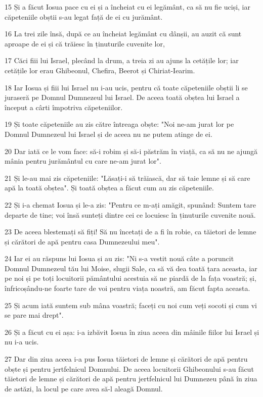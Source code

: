 \par 15 Și a făcut Iosua pace cu ei și a încheiat cu ei legământ, ca să nu fie uciși, iar căpeteniile obștii s-au legat față de ei cu jurământ.
\par 16 La trei zile însă, după ce au încheiat legământ cu dânșii, au auzit că sunt aproape de ei și că trăiesc în ținuturile cuvenite lor,
\par 17 Căci fiii lui Israel, plecând la drum, a treia zi au ajuns la cetățile lor; iar cetățile lor erau Ghibeonul, Chefira, Beerot și Chiriat-Iearim.
\par 18 Iar Iosua și fiii lui Israel nu i-au ucis, pentru că toate căpeteniile obștii li se juraseră pe Domnul Dumnezeul lui Israel. De aceea toată obștea lui Israel a început a cârti împotriva căpeteniilor.
\par 19 Și toate căpeteniile au zis către întreaga obște: "Noi ne-am jurat lor pe Domnul Dumnezeul lui Israel și de aceea nu ne putem atinge de ei.
\par 20 Dar iată ce le vom face: să-i robim și să-i păstrăm în viață, ca să nu ne ajungă mânia pentru jurământul cu care ne-am jurat lor".
\par 21 Și le-au mai zis căpeteniile: "Lăsați-i să trăiască, dar să taie lemne și să care apă la toată obștea". Și toată obștea a făcut cum au zis căpeteniile.
\par 22 Și i-a chemat Iosua și le-a zis: "Pentru ce m-ați amăgit, spunând: Suntem tare departe de tine; voi însă sunteți dintre cei ce locuiesc în ținuturile cuvenite nouă.
\par 23 De aceea blestemați să fiți! Să nu încetați de a fi în robie, ca tăietori de lemne și cărători de apă pentru casa Dumnezeului meu".
\par 24 Iar ei au răspuns lui Iosua și au zis: "Ni s-a vestit nouă câte a poruncit Domnul Dumnezeul tău lui Moise, slugii Sale, ca să vă dea toată țara aceasta, iar pe noi și pe toți locuitorii pământului acestuia să ne piardă de la fața voastră; și, înfricoșându-ne foarte tare de voi pentru viața noastră, am făcut fapta aceasta.
\par 25 Și acum iată suntem sub mâna voastră; faceți cu noi cum veți socoti și cum vi se pare mai drept".
\par 26 Și a făcut cu ei așa: i-a izbăvit Iosua în ziua aceea din mâinile fiilor lui Israel și nu i-a ucis.
\par 27 Dar din ziua aceea i-a pus Iosua tăietori de lemne și cărători de apă pentru obște și pentru jertfelnicul Domnului. De aceea locuitorii Ghibeonului s-au făcut tăietori de lemne și cărători de apă pentru jertfelnicul lui Dumnezeu până în ziua de astăzi, la locul pe care avea să-l aleagă Domnul.


